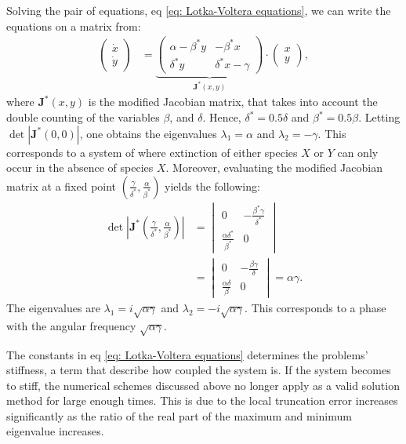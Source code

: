 \documentclass[a4paper]{article}
\newcommand{\newparagraph}{\vspace{.5cm}\noindent}
\begin{document}
\newparagraph
Solving the pair of equations, eq \eqref{eq: Lotka-Voltera equations}, we can write the equations on a matrix from:
\begin{align}
    \begin{pmatrix}
        \dot{x}\\
        \dot{y}
    \end{pmatrix} &= \underbrace{\begin{pmatrix}
        \alpha - \beta^* y & - \beta^* x \\
        \delta^* y & \delta^* x - \gamma       
    \end{pmatrix}}_{\mathbf{J}^*(x, y)}\cdot\begin{pmatrix}
        x\\
        y
    \end{pmatrix},
\end{align}where $\mathbf{J}^*(x,y)$ is the modified Jacobian matrix, that takes into account the double counting of the variables $\beta$, and $\delta$. Hence, $\delta^* = 0.5\delta$ and $\beta^* = 0.5\beta$. Letting $\det|\mathbf{J}^*(0,0)|$, one obtains the eigenvalues $\lambda_1 = \alpha$ and $\lambda_2 = -\gamma$. This corresponds to a system of where extinction of either species $X$ or $Y$ can only occur in the absence of species $X$.
Moreover, evaluating the modified Jacobian matrix at a fixed point $\left(\frac{\gamma}{\delta^*}, \frac{\alpha}{\beta^*}\right)$ yields the following:
\begin{align*}
    \det\left|\mathbf{J}^* \left(\frac{\gamma}{\delta^*}, \frac{\alpha}{\beta^*}\right)\right| &= \begin{vmatrix}
        0 & - \frac{\beta^*\gamma}{\delta^*}\\
        \frac{\alpha\delta^*}{\beta^*}&0
    \end{vmatrix}\\
    &= \begin{vmatrix}
        0 & - \frac{\beta\gamma}{\delta}\\
        \frac{\alpha\delta}{\beta}&0
    \end{vmatrix} = \alpha\gamma.
\end{align*}The eigenvalues are $\lambda_1 = i\sqrt{\alpha\gamma}$ and $\lambda_2 = -i \sqrt{\alpha\gamma}$. This corresponds to a phase with the angular frequency $\sqrt{\alpha\gamma}$.

\newparagraph
The constants in eq \eqref{eq: Lotka-Voltera equations} determines the problems' stiffness, a term that describe how coupled the system is. If the system becomes to stiff, the numerical schemes discussed above no longer apply as a valid solution method for large enough times. This is due to the local truncation error increases significantly as the ratio of the real part of the maximum and minimum eigenvalue increases. 
\end{document}
